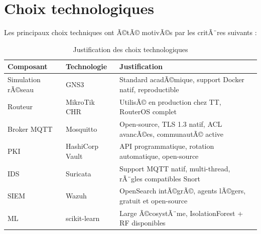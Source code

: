 \section{Choix technologiques}

Les principaux choix techniques ont Ã©tÃ© motivÃ©s par les critÃ¨res suivants :

\begin{table}[H]
\centering
\caption{Justification des choix technologiques}
\label{tab:choix_tech}
\begin{tabular}{llp{6cm}}
\toprule
\textbf{Composant} & \textbf{Technologie} & \textbf{Justification} \\
\midrule
Simulation rÃ©seau & GNS3 & Standard acadÃ©mique, support Docker natif, reproductible \\
Routeur & MikroTik CHR & UtilisÃ© en production chez TT, RouterOS complet \\
Broker MQTT & Mosquitto & Open-source, TLS 1.3 natif, ACL avancÃ©es, communautÃ© active \\
PKI & HashiCorp Vault & API programmatique, rotation automatique, open-source \\
IDS & Suricata & Support MQTT natif, multi-thread, rÃ¨gles compatibles Snort \\
SIEM & Wazuh & OpenSearch intÃ©grÃ©, agents lÃ©gers, gratuit et open-source \\
ML & scikit-learn & Large Ã©cosystÃ¨me, IsolationForest + RF disponibles \\
\bottomrule
\end{tabular}
\end{table}
